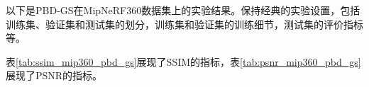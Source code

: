 以下是PBD-GS在MipNeRF360数据集上的实验结果。保持经典的实验设置，包括训练集、验证集和测试集的划分，训练集和验证集的训练细节，测试集的评价指标等。

\begin{table}[H]
    
\end{table}

\begin{table}[H]
    
\end{table}

表\ref{tab:ssim_mip360_pbd_gs}展现了SSIM的指标，表\ref{tab:psnr_mip360_pbd_gs}展现了PSNR的指标。